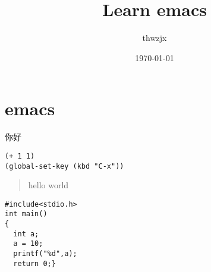 \documentclass[11pt]{article}
\author{thwzjx}
\date{\today}
\title{Learn emacs}
\begin{document}
\maketitle
\tableofcontents

\section{emacs}
\label{sec:orgbfff761}
你好
\begin{verbatim}
(+ 1 1)
(global-set-key (kbd "C-x"))
\end{verbatim}
\begin{quote}
hello world 
\end{quote}
\begin{verbatim}
#include<stdio.h>
int main()
{
  int a;
  a = 10;
  printf("%d",a);
  return 0;}
\end{verbatim}
\end{document}
